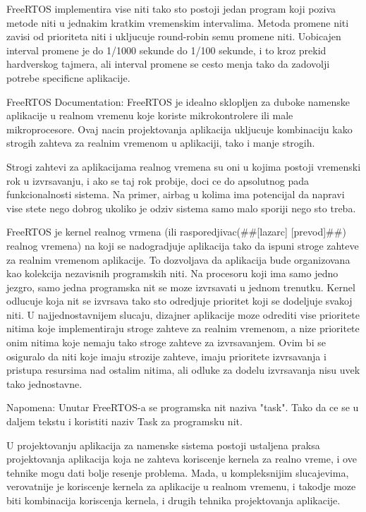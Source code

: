 \documentclass[a4paper,12pt, master]{etf}
\begin{document}
	FreeRTOS implementira vise niti tako sto postoji jedan program koji poziva metode niti u
	jednakim kratkim vremenskim intervalima. Metoda promene niti zavisi od prioriteta niti i
	ukljucuje round-robin semu promene niti. Uobicajen interval promene je do 1/1000 sekunde do
	1/100 sekunde, i to kroz prekid hardverskog tajmera, ali interval promene se cesto menja 
	tako da zadovolji potrebe specificne aplikacije.

	FreeRTOS Documentation:
	FreeRTOS je idealno sklopljen za duboke namenske aplikacije u realnom vremenu koje koriste
	mikrokontrolere ili male mikroprocesore. Ovaj nacin projektovanja aplikacija ukljucuje
	kombinaciju kako strogih zahteva za realnim vremenom u aplikaciji, tako i manje strogih.

	Strogi zahtevi za aplikacijama realnog vremena su oni u kojima postoji vremenski rok u
	izvrsavanju, i ako se taj rok probije, doci ce do apsolutnog pada funkcionalnosti sistema. 
	Na primer, airbag u kolima ima potencijal da napravi vise stete nego dobrog ukoliko je 
	odziv sistema samo malo sporiji nego sto treba.

	FreeRTOS je kernel realnog vrmena (ili rasporedjivac(\#\#[lazarc] [prevod]\#\#) realnog 
	vremena) na	koji se nadogradjuje aplikacija tako da ispuni stroge zahteve za realnim 
	vremenom aplikacije. To dozvoljava da aplikacija bude organizovana kao kolekcija 
	nezavisnih programskih niti. Na	procesoru koji ima samo jedno jezgro, samo jedna 
	programska nit se moze izvrsavati u jednom trenutku. Kernel odlucuje koja nit se izvrsava 
	tako sto odredjuje prioritet koji se dodeljuje svakoj niti. U najjednostavnijem slucaju, 
	dizajner aplikacije moze odrediti vise prioritete nitima koje implementiraju stroge 
	zahteve za realnim vremenom, a nize prioritete onim nitima koje nemaju tako stroge zahteve 
	za izvrsavanjem. Ovim bi se osiguralo da niti koje imaju strozije zahteve, imaju 
	prioritete izvrsavanja i pristupa resursima nad ostalim nitima, ali odluke za dodelu 
	izvrsavanja nisu uvek tako jednostavne.

	Napomena: Unutar FreeRTOS-a se programska nit naziva "task". Tako da ce se u daljem tekstu 
	i koristiti naziv Task za programsku nit.

	U projektovanju aplikacija za namenske sistema postoji ustaljena praksa projektovanja
	aplikacija koja ne zahteva koriscenje kernela za realno vreme, i ove tehnike mogu dati 
	bolje resenje problema. Mada, u kompleksnijim slucajevima, verovatnije je koriscenje 
	kernela za aplikacije u realnom vremenu, i takodje moze biti kombinacija koriscenja 
	kernela, i drugih tehnika projektovanja aplikacije.
\end{document}

